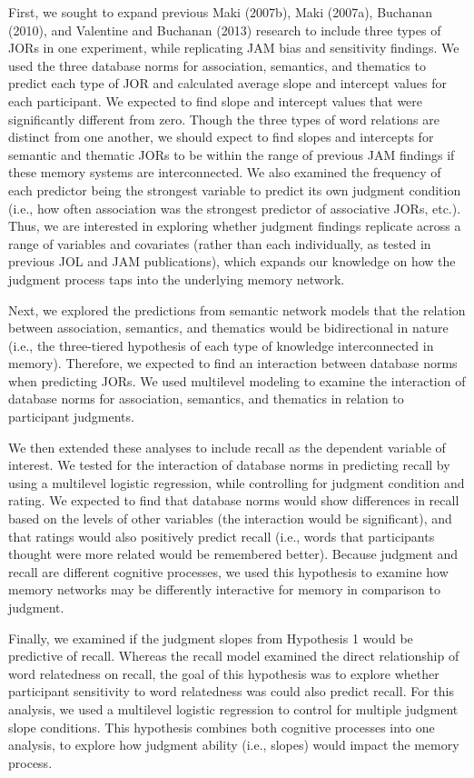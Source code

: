 \documentclass[english,,man]{apa6}
\begin{document}
First, we sought to expand previous Maki (2007b), Maki (2007a), Buchanan
(2010), and Valentine and Buchanan (2013) research to include three
types of JORs in one experiment, while replicating JAM bias and
sensitivity findings. We used the three database norms for association,
semantics, and thematics to predict each type of JOR and calculated
average slope and intercept values for each participant. We expected to
find slope and intercept values that were significantly different from
zero. Though the three types of word relations are distinct from one
another, we should expect to find slopes and intercepts for semantic and
thematic JORs to be within the range of previous JAM findings if these
memory systems are interconnected. We also examined the frequency of
each predictor being the strongest variable to predict its own judgment
condition (i.e., how often association was the strongest predictor of
associative JORs, etc.). Thus, we are interested in exploring whether
judgment findings replicate across a range of variables and covariates
(rather than each individually, as tested in previous JOL and JAM
publications), which expands our knowledge on how the judgment process
taps into the underlying memory network.

Next, we explored the predictions from semantic network models that the
relation between association, semantics, and thematics would be
bidirectional in nature (i.e., the three-tiered hypothesis of each type
of knowledge interconnected in memory). Therefore, we expected to find
an interaction between database norms when predicting JORs. We used
multilevel modeling to examine the interaction of database norms for
association, semantics, and thematics in relation to participant
judgments.

We then extended these analyses to include recall as the dependent
variable of interest. We tested for the interaction of database norms in
predicting recall by using a multilevel logistic regression, while
controlling for judgment condition and rating. We expected to find that
database norms would show differences in recall based on the levels of
other variables (the interaction would be significant), and that ratings
would also positively predict recall (i.e., words that participants
thought were more related would be remembered better). Because judgment
and recall are different cognitive processes, we used this hypothesis to
examine how memory networks may be differently interactive for memory in
comparison to judgment.

Finally, we examined if the judgment slopes from Hypothesis 1 would be
predictive of recall. Whereas the recall model examined the direct
relationship of word relatedness on recall, the goal of this hypothesis
was to explore whether participant sensitivity to word relatedness was
could also predict recall. For this analysis, we used a multilevel
logistic regression to control for multiple judgment slope conditions.
This hypothesis combines both cognitive processes into one analysis, to
explore how judgment ability (i.e., slopes) would impact the memory
process.
\end{document}
